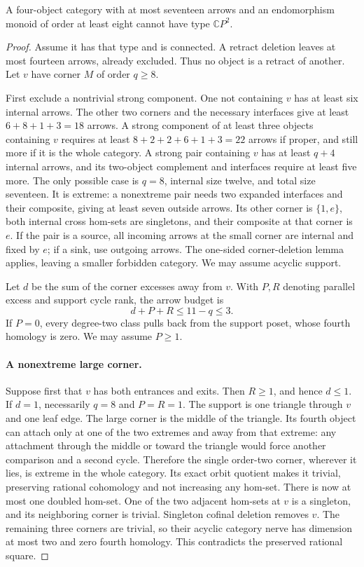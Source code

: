 \begin{proposition}\label{C:seventeen-four-large-corner}
A four-object category with at most seventeen arrows and an
endomorphism monoid of order at least eight cannot have type
$\mathbb CP^2$.
\end{proposition}
\begin{proof}
Assume it has that type and is connected. A retract deletion
leaves at most fourteen arrows, already excluded. Thus no
object is a retract of another. Let $v$ have corner $M$ of
order $q\geq8$.

First exclude a nontrivial strong component. One not containing
$v$ has at least six internal arrows. The other two corners
and the necessary interfaces give at least
$6+8+1+3=18$ arrows. A strong component of at least three
objects containing $v$ requires at least
$8+2+2+6+1+3=22$ arrows if proper, and still more if it is
the whole category. A strong pair containing $v$ has at least
$q+4$ internal arrows, and its two-object complement and
interfaces require at least five more. The only possible
case is $q=8$, internal size twelve, and total size seventeen.
It is extreme: a nonextreme pair needs two expanded interfaces
and their composite, giving at least seven outside arrows.
Its other corner is $\{1,e\}$, both internal cross hom-sets
are singletons, and their composite at that corner is $e$.
If the pair is a source, all incoming arrows at the small
corner are internal and fixed by $e$; if a sink, use outgoing
arrows. The one-sided corner-deletion lemma applies, leaving
a smaller forbidden category. We may assume acyclic support.

Let $d$ be the sum of the corner excesses away from $v$.
With $P,R$ denoting parallel excess and support cycle rank,
the arrow budget is
\[
 d+P+R\leq11-q\leq3.
\]
If $P=0$, every degree-two class pulls back from the support
poset, whose fourth homology is zero. We may assume $P\geq1$.

\paragraph{A nonextreme large corner.}
Suppose first that $v$ has both entrances and exits.
Then $R\geq1$, and hence $d\leq1$. If $d=1$, necessarily
$q=8$ and $P=R=1$. The support is one triangle through
$v$ and one leaf edge. The large corner is the middle of
the triangle. Its fourth object can attach only at one of
the two extremes and away from that extreme: any attachment
through the middle or toward the triangle would force another
comparison and a second cycle. Therefore the single order-two
corner, wherever it lies, is extreme in the whole category.
Its exact orbit quotient makes it trivial, preserving rational
cohomology and not increasing any hom-set. There is now at
most one doubled hom-set. One of the two adjacent hom-sets
at $v$ is a singleton, and its neighboring corner is trivial.
Singleton cofinal deletion removes $v$.
The remaining three corners are trivial, so their acyclic
category nerve has dimension at most two and zero fourth
homology. This contradicts the preserved rational square.


\end{proof}
